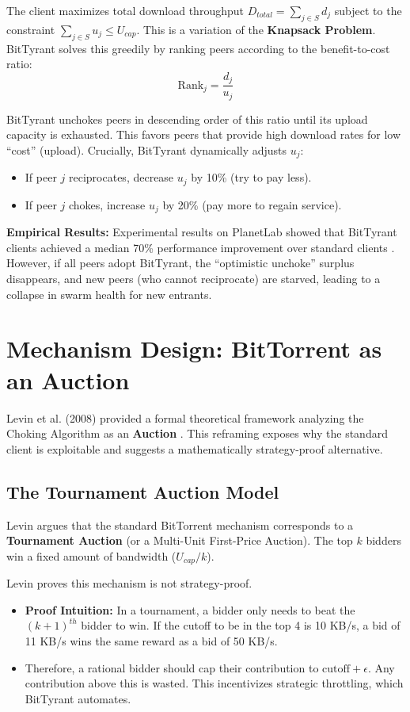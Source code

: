 \documentclass[12pt]{article}
\begin{document}
The client maximizes total download throughput $D_{total} = \sum_{j \in S} d_j$ subject to the constraint $\sum_{j \in S} u_j \le U_{cap}$. This is a variation of the \textbf{Knapsack Problem}. BitTyrant solves this greedily by ranking peers according to the benefit-to-cost ratio:
\begin{equation}
\text{Rank}_j = \frac{d_j}{u_j}
\end{equation}

BitTyrant unchokes peers in descending order of this ratio until its upload capacity is exhausted. This favors peers that provide high download rates for low ``cost'' (upload). Crucially, BitTyrant dynamically adjusts $u_j$:
\begin{itemize}
    \item If peer $j$ reciprocates, decrease $u_j$ by 10\% (try to pay less).
    \item If peer $j$ chokes, increase $u_j$ by 20\% (pay more to regain service).
\end{itemize}

\textbf{Empirical Results:} Experimental results on PlanetLab showed that BitTyrant clients achieved a median 70\% performance improvement over standard clients \cite{Piatek2007}. However, if all peers adopt BitTyrant, the ``optimistic unchoke'' surplus disappears, and new peers (who cannot reciprocate) are starved, leading to a collapse in swarm health for new entrants.

\section{Mechanism Design: BitTorrent as an Auction}

Levin et al. (2008) provided a formal theoretical framework analyzing the Choking Algorithm as an \textbf{Auction} \cite{Levin2008}. This reframing exposes why the standard client is exploitable and suggests a mathematically strategy-proof alternative.

\subsection{The Tournament Auction Model}
Levin argues that the standard BitTorrent mechanism corresponds to a \textbf{Tournament Auction} (or a Multi-Unit First-Price Auction). The top $k$ bidders win a fixed amount of bandwidth ($U_{cap}/k$).

Levin proves this mechanism is not strategy-proof.
\begin{itemize}
    \item \textbf{Proof Intuition:} In a tournament, a bidder only needs to beat the $(k+1)^{th}$ bidder to win. If the cutoff to be in the top 4 is 10 KB/s, a bid of 11 KB/s wins the same reward as a bid of 50 KB/s. 
    \item Therefore, a rational bidder should cap their contribution to $\text{cutoff} + \epsilon$. Any contribution above this is wasted. This incentivizes strategic throttling, which BitTyrant automates.
\end{itemize}
\end{document}
